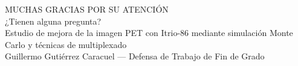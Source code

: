 \documentclass[aspectratio=169]{beamer}
\begin{document}
{
\begin{frame}
    \begin{center}
        \MakeUppercase{Muchas gracias por su atención}\\[1cm]
        \color{mcmPrimaryAccent!60!white}¿Tienen alguna pregunta?\\[2cm]
        \color{mcmPrimaryFg!80!white}Estudio de mejora de la imagen PET con Itrio-86 mediante simulación Monte Carlo y técnicas de multiplexado\\
        \color{mcmPrimaryFg!60!white}Guillermo Gutiérrez Caracuel — Defensa de Trabajo de Fin de Grado
    \end{center}
\end{frame}
}
\end{document}
